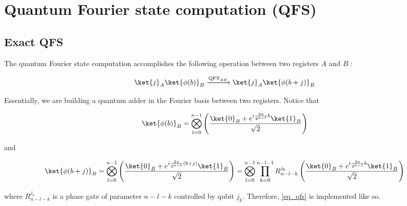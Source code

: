 \newpage
\section{Quantum Fourier state computation (QFS)}
\subsection{Exact QFS}
The quantum Fourier state computation accomplishes the following operation between two registers $A$ and $B$ : 

\begin{equation}
    \ket{j}_A\ket{\phi(b)}_B \xrightarrow{\text{QFS}_{AB}} \ket{j}_A\ket{\phi(b+j)}_B
    \label{eq_qfs}
\end{equation}

Essentially, we are building a quantum adder in the Fourier basis between two registers. Notice that 

\begin{equation*}
    \ket{\phi(b)}_B = \bigotimes_{l=0}^{n-1}\left(\frac{\ket{0}_B+e^{i\frac{2\pi}{2^{n-l}}b}\ket{1}_B}{\sqrt{2}}\right)
\end{equation*}

and

\begin{equation*}
    \ket{\phi(b+j)}_B = \bigotimes_{l=0}^{n-1}\left(\frac{\ket{0}_B + e^{i\frac{2\pi}{2^{n-l}}(b+j)}\ket{1}_B}{\sqrt{2}}\right) 
    = \bigotimes_{l=0}^{n-1}\prod_{k=0}^{n-l-1}R_{n-l-k}^{j_k}\left(\frac{\ket{0}_B+e^{i\frac{2\pi}{2^{n-l}}b}\ket{1}_B}{\sqrt{2}}\right)
\end{equation*}

where $R_{n-l-k}^{j_k}$ is a phase gate of parameter $n-l-k$ controlled by qubit $j_k$. Therefore, \ref{eq_qfs} is implemented like so. 

